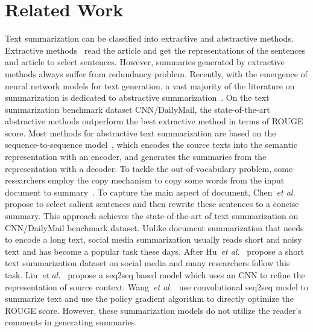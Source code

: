 \documentclass[letterpaper]{article}
\newcommand{\etal}{\emph{et al.}\xspace}
\begin{document}
\section{Related Work}
Text summarization can be classified into extractive and abstractive methods.
Extractive methods~\cite{Jadhav2018ExtractiveSW,Narayan2018RankingSF} read the article and get the representations of the sentences and article to select sentences.
However, summaries generated by extractive methods always suffer from redundancy problem.
Recently, with the emergence of neural network models for text generation, a vast majority of the literature on summarization is dedicated to abstractive summarization~\cite{Bansal2018FastAS,Ma2018AutoencoderAA,Zhou2018SequentialCN}.
On the text summarization benchmark dataset CNN/DailyMail, the state-of-the-art abstractive methods outperform the best extractive method in terms of ROUGE score.
Most methods for abstractive text summarization are based on the sequence-to-sequence model~\cite{Sutskever2014SequenceTS}, which encodes the source texts into the semantic representation with an encoder, and generates the summaries from the representation with a decoder.
To tackle the out-of-vocabulary problem, some researchers employ the copy mechanism to copy some words from the input document to summary~\cite{Gu2016IncorporatingCM,see2017get}.
To capture the main aspect of document, Chen~\etal~ propose to select salient sentences and then rewrite these sentences to a concise summary.
This approach achieves the state-of-the-art of text summarization on CNN/DailyMail benchmark dataset.
Unlike document summarization that needs to encode a long text, social media summarization usually reads short and noisy text and has become a popular task these days.
After Hu~\etal~ propose a short text summarization dataset on social media and many researchers follow this task.
Lin~\etal~ propose a seq2seq based model which uses an CNN to refine the representation of source context.
Wang~\etal~ use convolutional seq2seq model to summarize text and use the policy gradient algorithm to directly optimize the ROUGE score.
However, these summarization models do not utilize the reader's comments in generating summaries.
\end{document}
